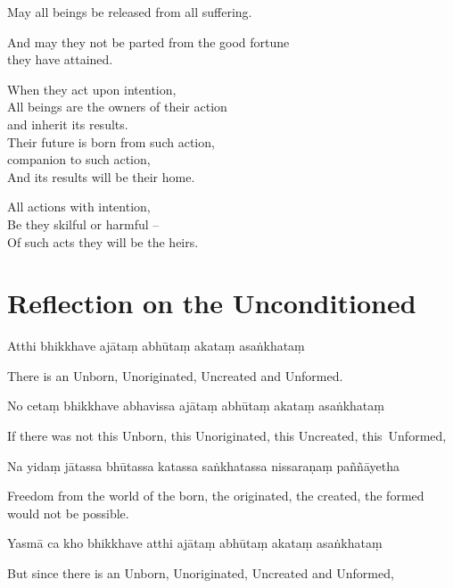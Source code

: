 May all beings be released from all suffering.

And may they not be parted from the good fortune\\
they have attained.

When they act upon intention,\\
All beings are the owners of their action\\
and inherit its results.\\
Their future is born from such action,\\
companion to such action,\\
And its results will be their home.

All actions with intention,\\
Be they skilful or harmful --\\
Of such acts they will be the heirs. 

\section[The Unconditioned]{Reflection on the Unconditioned}

\begin{leader}
\end{leader}


Atthi bhikkhave ajātaṃ abhūtaṃ akataṃ asaṅkhataṃ

\begin{english}
  There is an Unborn, Unoriginated, Uncreated and Unformed.
\end{english}

No cetaṃ bhikkhave abhavissa ajātaṃ abhūtaṃ akataṃ asaṅkhataṃ

\begin{english}
  If there was not this Unborn, this Unoriginated, this Uncreated, this~Unformed,
\end{english}

Na yidaṃ jātassa bhūtassa katassa saṅkhatassa nissaraṇaṃ paññāyetha

\begin{english}
  Freedom from the world of the born, the originated, the created, the formed would not be possible.
\end{english}

Yasmā ca kho bhikkhave atthi ajātaṃ abhūtaṃ akataṃ asaṅkhataṃ

\begin{english}
  But since there is an Unborn, Unoriginated, Uncreated and Unformed,
\end{english}

